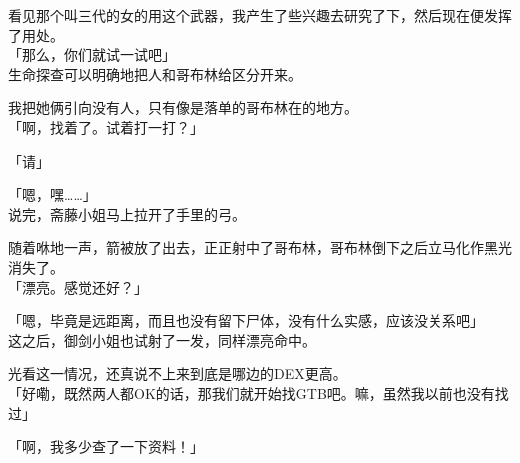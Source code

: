 看见那个叫三代的女的用这个武器，我产生了些兴趣去研究了下，然后现在便发挥了用处。\\

「那么，你们就试一试吧」\\

生命探查可以明确地把人和哥布林给区分开来。

我把她俩引向没有人，只有像是落单的哥布林在的地方。\\

「啊，找着了。试着打一打？」

「请」

「嗯，嘿……」\\

说完，斋藤小姐马上拉开了手里的弓。

随着咻地一声，箭被放了出去，正正射中了哥布林，哥布林倒下之后立马化作黑光消失了。\\

「漂亮。感觉还好？」

「嗯，毕竟是远距离，而且也没有留下尸体，没有什么实感，应该没关系吧」\\

这之后，御剑小姐也试射了一发，同样漂亮命中。

光看这一情况，还真说不上来到底是哪边的DEX更高。\\

「好嘞，既然两人都OK的话，那我们就开始找GTB吧。嘛，虽然我以前也没有找过」

「啊，我多少查了一下资料！」

